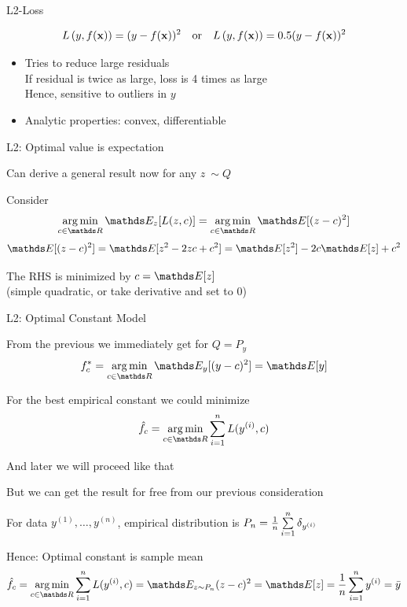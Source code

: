 \documentclass[11pt,compress,t,notes=noshow, xcolor=table]{beamer}
\begin{document}
    

\begin{frame}{L2-Loss}

$$
L\left(y, f(\mathbf{x})\right) = (y-f(\mathbf{x}))^2 \quad \text{or} \quad L\left(y, f(\mathbf{x})\right) = 0.5 (y-f(\mathbf{x}))^2
$$

\vfill

\begin{itemize}
\item Tries to reduce large residuals \\
If residual is twice as large, loss is 4 times as large\\
Hence, sensitive to outliers in $y$
\item Analytic properties: convex, differentiable 
\end{itemize}


\end{frame}


\begin{framei}[sep=L]{L2: Optimal value is expectation}

\item Can derive a general result now for any $z ~ \sim Q$
\item Consider 
$$ \argmin_{c \in \R}  \E_{z} [L(z, c)] = \argmin_{c \in \R}  \E [(z - c)^2] $$
$$\E [(z - c)^2] =  \E [z^2 - 2zc + c^2 ] = \E[z^2] -2c\E[z] + c^2   $$

\item The RHS is minimized by $c = \E[z]$\\
(simple quadratic, or take derivative and set to 0)

\end{framei}


\begin{framei}[sep=S]{L2: Optimal Constant Model}

\item From the previous we immediately get for $Q = P_y$
$$
f_{c}^{\ast} = \argmin_{c \in \R} \E_{y} [ (y - c)^2 ] = \E[y]
$$
\item For the best empirical constant we could minimize   
$$\hat{f}_c = \argminlim_{c \in \R} \sumin L(\yi,c)$$

And later we will proceed like that
\item But we can get the result for free from our previous consideration
  
\item For data $y^{(1)}, \ldots, y^{(n)}$, empirical distribution is $P_n = \frac{1}{n} \sum\limits_{i=1}^n \delta_{y^{(i)}}$

\item Hence: Optimal constant is sample mean
$$\hat{f}_c = \argminlim_{c \in \R} \sumin L(\yi,c) = 
\E_{z \sim P_n} (z-c)^2 = \E[z] = \meanin \yi = \bar{y}
$$

\end{framei}
\end{document}
